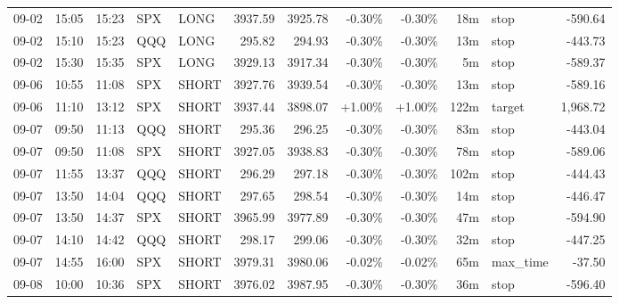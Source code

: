 \documentclass[11pt,a4paper]{article}
\begin{document}
\begin{center}
\begin{longtable}{>{\color{txtmain}}l l l l l r r r r r >{\color{txtmain}}l r}
09-02 & 15:05 & 15:23 & SPX & LONG & 3937.59 & 3925.78 & \textcolor{lossred}{-0.30\%} & \textcolor{lossred}{-0.30\%} & 18m & stop & \textcolor{lossred}{-590.64} \\
09-02 & 15:10 & 15:23 & QQQ & LONG & 295.82 & 294.93 & \textcolor{lossred}{-0.30\%} & \textcolor{lossred}{-0.30\%} & 13m & stop & \textcolor{lossred}{-443.73} \\
09-02 & 15:30 & 15:35 & SPX & LONG & 3929.13 & 3917.34 & \textcolor{lossred}{-0.30\%} & \textcolor{lossred}{-0.30\%} & 5m & stop & \textcolor{lossred}{-589.37} \\
09-06 & 10:55 & 11:08 & SPX & SHORT & 3927.76 & 3939.54 & \textcolor{lossred}{-0.30\%} & \textcolor{lossred}{-0.30\%} & 13m & stop & \textcolor{lossred}{-589.16} \\
09-06 & 11:10 & 13:12 & SPX & SHORT & 3937.44 & 3898.07 & \textcolor{wingreen}{+1.00\%} & \textcolor{wingreen}{+1.00\%} & 122m & target & \textcolor{wingreen}{1,968.72} \\
09-07 & 09:50 & 11:13 & QQQ & SHORT & 295.36 & 296.25 & \textcolor{lossred}{-0.30\%} & \textcolor{lossred}{-0.30\%} & 83m & stop & \textcolor{lossred}{-443.04} \\
09-07 & 09:50 & 11:08 & SPX & SHORT & 3927.05 & 3938.83 & \textcolor{lossred}{-0.30\%} & \textcolor{lossred}{-0.30\%} & 78m & stop & \textcolor{lossred}{-589.06} \\
09-07 & 11:55 & 13:37 & QQQ & SHORT & 296.29 & 297.18 & \textcolor{lossred}{-0.30\%} & \textcolor{lossred}{-0.30\%} & 102m & stop & \textcolor{lossred}{-444.43} \\
09-07 & 13:50 & 14:04 & QQQ & SHORT & 297.65 & 298.54 & \textcolor{lossred}{-0.30\%} & \textcolor{lossred}{-0.30\%} & 14m & stop & \textcolor{lossred}{-446.47} \\
09-07 & 13:50 & 14:37 & SPX & SHORT & 3965.99 & 3977.89 & \textcolor{lossred}{-0.30\%} & \textcolor{lossred}{-0.30\%} & 47m & stop & \textcolor{lossred}{-594.90} \\
09-07 & 14:10 & 14:42 & QQQ & SHORT & 298.17 & 299.06 & \textcolor{lossred}{-0.30\%} & \textcolor{lossred}{-0.30\%} & 32m & stop & \textcolor{lossred}{-447.25} \\
09-07 & 14:55 & 16:00 & SPX & SHORT & 3979.31 & 3980.06 & \textcolor{lossred}{-0.02\%} & \textcolor{lossred}{-0.02\%} & 65m & max\_time & \textcolor{lossred}{-37.50} \\
09-08 & 10:00 & 10:36 & SPX & SHORT & 3976.02 & 3987.95 & \textcolor{lossred}{-0.30\%} & \textcolor{lossred}{-0.30\%} & 36m & stop & \textcolor{lossred}{-596.40} \\

\end{longtable}
\end{center}
\end{document}
